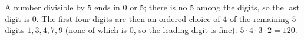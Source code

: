 A number divisible by $5$ ends in $0$ or $5$; there is no $5$ among the digits, so the last digit is $0$. The first four digits are then an ordered choice of $4$ of the remaining $5$ digits $1,3,4,7,9$ (none of which is $0$, so the leading digit is fine): $5\cdot4\cdot3\cdot2=\boxed{120}$.
